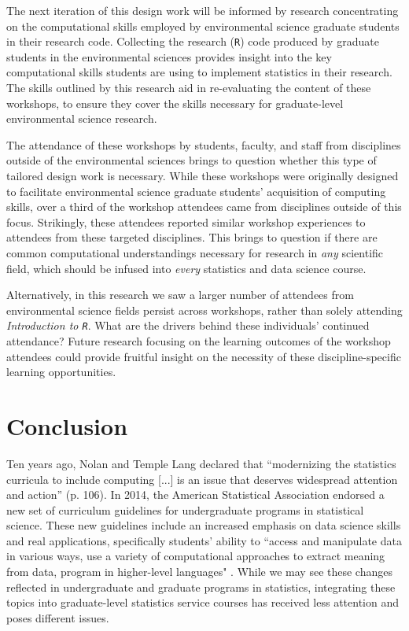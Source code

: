 \documentclass[12pt]{article}
\begin{document}
\quad The next iteration of this design work will be informed by research concentrating on the computational skills employed by environmental science graduate students in their research code. Collecting the research (\texttt{R}) code produced by graduate students in the environmental sciences provides insight into the key computational skills students are using to implement statistics in their research. The skills outlined by this research aid in re-evaluating the content of these workshops, to ensure they cover the skills necessary for graduate-level environmental science research. 

\quad The attendance of these workshops by students, faculty, and staff from disciplines outside of the environmental sciences brings to question whether this type of tailored design work is necessary. While these workshops were originally designed to facilitate environmental science graduate students' acquisition of computing skills, over a third of the workshop attendees came from disciplines outside of this focus. Strikingly, these attendees reported similar workshop experiences to attendees from these targeted disciplines. This brings to question if there are common computational understandings necessary for research in \emph{any} scientific field, which should be infused into \emph{every} statistics and data science course. 

\quad Alternatively, in this research we saw a larger number of attendees from environmental science fields persist across workshops, rather than solely attending \emph{Introduction to \texttt{R}}. What are the drivers behind these individuals' continued attendance? Future research focusing on the learning outcomes of the workshop attendees could provide fruitful insight on the necessity of these discipline-specific learning opportunities. 

\section{Conclusion}
\label{sec:conclusion}

\quad Ten years ago, Nolan and Temple Lang declared that ``modernizing the statistics curricula to include computing [...] is an issue that deserves widespread attention and action'' (p. 106). In 2014, the American Statistical Association endorsed a new set of curriculum guidelines for undergraduate programs in statistical science. These new guidelines include an increased emphasis on data science skills and real applications, specifically students' ability to ``access and manipulate data in various ways, use a variety of computational approaches to extract meaning from data, program in higher-level languages" \citep[p. 7]{asa}. While we may see these changes reflected in undergraduate and graduate programs in statistics, integrating these topics into graduate-level statistics service courses has received less attention and poses different issues. 
\end{document}

